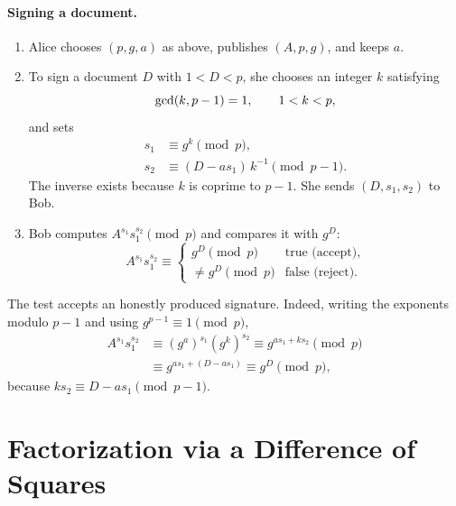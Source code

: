 
\paragraph{Signing a document.}
\begin{enumerate}[leftmargin=1.6em]
    \item Alice chooses $(p,g,a)$ as above, publishes $(A,p,g)$, and
    keeps $a$.

    \item To sign a document $D$ with $1<D<p$, she chooses an integer $k$
    satisfying
    \[
        \operatorname{gcd}(k,p-1)=1,
        \qquad
        1<k<p,
    \]
    and sets
    \begin{align*}
        s_{1}&\equiv g^{k}\pmod{p},\\
        s_{2}&\equiv (D-as_{1})\,k^{-1}\pmod{p-1}.
    \end{align*}
    The inverse exists because $k$ is coprime to $p-1$. She sends
    $(D,s_{1},s_{2})$ to Bob.

    \item Bob computes $A^{s_{1}}s_{1}^{s_{2}}\pmod{p}$ and compares it
    with $g^{D}$:
    \[
        A^{s_{1}}s_{1}^{s_{2}}
        \equiv
        \begin{cases}
            g^{D}\pmod{p} & \text{true (accept)},\\
            \neq g^{D}\pmod{p} & \text{false (reject)}.
        \end{cases}
    \]
\end{enumerate}

The test accepts an honestly produced signature. Indeed, writing the
exponents modulo $p-1$ and using $g^{p-1}\equiv 1\pmod{p}$,
\begin{align*}
    A^{s_{1}}s_{1}^{s_{2}}
    &\equiv (g^{a})^{s_{1}}(g^{k})^{s_{2}}
     \equiv g^{as_{1}+ks_{2}}\pmod{p}\\
    &\equiv g^{as_{1}+(D-as_{1})}
     \equiv g^{D}\pmod{p},
\end{align*}
because $ks_{2}\equiv D-as_{1}\pmod{p-1}$.


\section{Factorization via a Difference of Squares}

